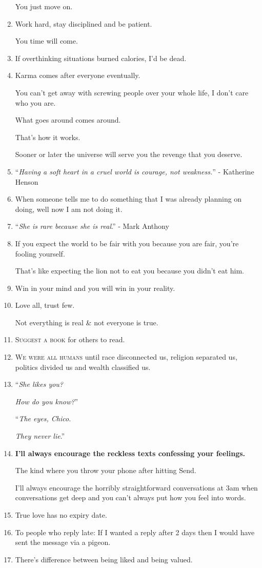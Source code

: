 \documentclass{article}
\begin{document}
\begin{enumerate}
	You just move on.
	\item Work hard, stay disciplined and be patient.
	
	You time will come.
	\item If overthinking situations burned calories, I'd be dead.
	\item Karma comes after everyone eventually.
	
	You can't get away with screwing people over your whole life, I don't care who you are.
	
	What goes around comes around.
	
	That's how it works.
	
	Sooner or later the universe will serve you the revenge that you deserve.
	\item ``\textit{Having a soft heart in a cruel world is courage, not weakness.}'' - Katherine Henson
	\item When someone tells me to do something that I was already planning on doing, well now I am not doing it.
	\item ``\textit{She is rare because she is real}.'' - Mark Anthony
	\item If you expect the world to be fair with you because you are fair, you're fooling yourself.
	
	That's like expecting the lion not to eat you because you didn't eat him.
	\item Win in your mind and you will win in your reality.
	\item Love all, trust few.
	
	Not everything is real \& not everyone is true.
	\item \textsc{Suggest a book} for others to read.
	\item \textsc{We were all humans} until race disconnected us, religion separated us, politics divided us and wealth classified us.
	\item ``\textit{She likes you?}
	
	\textit{How do you know?}''
	
	``\textit{The eyes, Chico}.
	
	\textit{They never lie}.''
	\item \textbf{I'll always encourage the reckless texts confessing your feelings.}
	
	The kind where you throw your phone after hitting Send.
	
	I'll always encourage the horribly straightforward conversations at 3am when conversations get deep and you can't always put how you feel into words.
	\item True love has no expiry date.
	\item To people who reply late: If I wanted a reply after 2 days then I would have sent the message via a pigeon.
	\item There's difference between being liked and being valued.
	

\end{enumerate}
\end{document}
